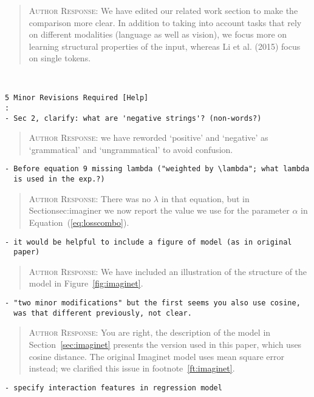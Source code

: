 \begin{quote}
\textsc{Author Response:} We have edited our related work section to make the comparison more 
clear. In addition to taking into account tasks that rely on different modalities (language as well as vision), 
we focus more on learning structural properties of the input, whereas Li et al. (2015) focus on single
tokens.
\end{quote}
\begin{verbatim}


5 Minor Revisions Required [Help]
: 
- Sec 2, clarify: what are 'negative strings'? (non-words?)
\end{verbatim}  
\begin{quote}
\textsc{Author Response:}  we have reworded `positive' and `negative' as `grammatical' 
and `ungrammatical' to avoid confusion.
\end{quote}
\begin{verbatim}
- Before equation 9 missing lambda ("weighted by \lambda"; what lambda
  is used in the exp.?)
\end{verbatim}  
\begin{quote}
\textsc{Author Response:}  There was no $\lambda$ in that equation, but in 
Section{sec:imaginer} we now report the value we use for the parameter 
$\alpha$ in Equation~(\ref{eq:losscombo}).
\end{quote}
\begin{verbatim}
- it would be helpful to include a figure of model (as in original
  paper)
\end{verbatim}  
\begin{quote}
\textsc{Author Response:}  We have included an illustration of the structure of the model in Figure~\ref{fig:imaginet}.
\end{quote}
\begin{verbatim}
- "two minor modifications" but the first seems you also use cosine,
  was that different previously, not clear.
\end{verbatim}  
\begin{quote}
\textsc{Author Response:}  You are right, the description of the model in Section~\ref{sec:imaginet} presents the version used in this paper, which uses cosine distance. The original Imaginet model uses mean square error instead; we clarified this issue in footnote~\ref{ft:imaginet}.  
\end{quote}
\begin{verbatim}
- specify interaction features in regression model
\end{verbatim}  
